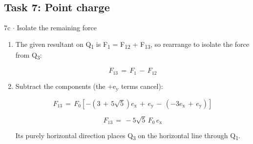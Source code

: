 \documentclass[11pt]{article}
\begin{document}
\begin{keepsection}\subsection{Task 7: Point charge}

\begin{workedbox}{7c \ensuremath{\cdot} Isolate the remaining force}
\begin{enumerate}
\item {}
The given resultant on Q\textsubscript{1} is F\textsubscript{1} = F\textsubscript{12} + F\textsubscript{13}, so rearrange to isolate the force from Q\textsubscript{3}:

\begin{equation*}{F}_{13}\, =\, {F}_{1}\, -\, {F}_{12}\end{equation*}
\item {}
Subtract the components (the +e\textsubscript{y} terms cancel):

\begin{equation*}{F}_{13}\, =\, {F}_{0}[-(3\, +\, 5\sqrt{5}){e}_{\mathrm{x}}\, +\, {e}_{\mathrm{y}}\, -\, (-3{e}_{\mathrm{x}}\, +\, {e}_{\mathrm{y}})]\end{equation*}

\begin{equation*}{F}_{13}\, =\, -5\sqrt{5}\, {F}_{0}\, {e}_{\mathrm{x}}\end{equation*}

Its purely horizontal direction places Q\textsubscript{3} on the horizontal line through Q\textsubscript{1}.
\end{enumerate}
\end{workedbox}

\end{keepsection}
\end{document}
